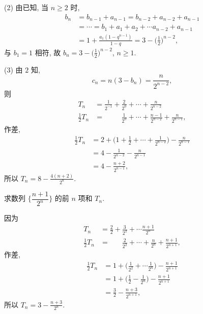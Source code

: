     (2) 由已知, 当 $n\geqslant 2$ 时,
    \[\begin{aligned}
        b_n&= b_{n-1}+ a_{n-1}= b_{n-2}+ a_{n-2}+ a_{n-1}\\
        &= \cdots= b_1+ a_1+ a_2+\cdots a_{n-2}+ a_{n-1}\\
        &= 1+ \frac{a_1(1-q^{n-1})}{1-q}
         = 3- \biggl(\frac12\biggr)^{n-2},
    \end{aligned}\]
    与 $b_1= 1$ 相符, 故 $b_n= 3- \biggl(\frac12\biggr)^{n-2}$, $n\geqslant 1$.

    (3) 由 $2$ 知,
    \[c_n= n(3-b_n)= \frac{n}{2^{n-2}},\]
    则
    \[\begin{aligned}
        T_n
        &= \frac1{2^{-1}}+ \frac2{2^{0}}+\cdots 
            +\frac{n}{2^{n-2}}\\
        \frac12 T_n
        &= \phantom{\frac1{2^{-1}}+ {}} \frac1{2^{0}}+\cdots 
            + \frac{n-1}{2^{n-2}}+ \frac{n}{2^{n-1}},
    \end{aligned}\]
    作差,
    \[\begin{aligned}
        \frac12 T_n &= 2+ \biggl(1+\frac12+ \cdots
            + \frac1{2^{n-2}}\biggr)- \frac{n}{2^{n-1}}\\
        &= 4- \frac1{2^{n-2}}- \frac{n}{2^{n-1}}\\
        &= 4- \frac{n+2}{2^{n-1}},
    \end{aligned}\]
    所以 $T_n= 8- \frac{4(n+2)}{2^n}$.
\endsolution

\lianxi
\begin{exercise}[s]
    求数列 $\Big\{\dfrac{n+1}{2^n}\Big\}$ 的前 $n$ 项和 $T_n$.
\end{exercise}
\beginsolution
    因为
    \[\begin{aligned}
        T_n
        &= \frac2{2}+ \frac3{2^2}+\cdots \frac{n+1}{2^n}\\
            \frac12 T_n
        &= \phantom{\frac2{2}+ {}} \frac2{2^2}+\cdots 
            + \frac{n}{2^n}+ \frac{n+1}{2^{n+1}},
    \end{aligned}\]
    作差,
    \[\begin{aligned}
        \frac12 T_n 
        &= 1+ \biggl(\frac1{2^2}+ \cdots
            \frac1{2^n}\biggr)- \frac{n+1}{2^{n+1}}\\
        &= 1+ \biggl(\frac12- \frac1{2^n}\biggr)- \frac{n+1}{2^{n+1}}\\
        &= \frac32- \frac{n+3}{2^{n+1}},
    \end{aligned}\]
    所以 $T_n= 3- \frac{n+3}{2^n}$.
\endsolution
 
